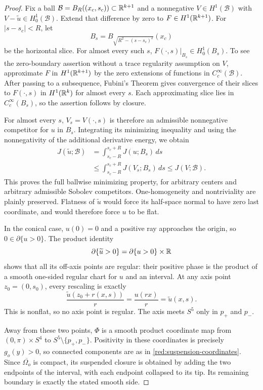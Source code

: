 \begin{proof}
Fix a ball $\mathcal B=B_R((x_c,s_c))\subset\mathbb R^{k+1}$ and a nonnegative
$V\in H^1(\mathcal B)$ with $V-\widetilde u\in H^1_0(\mathcal B)$.
Extend that difference by zero to $F\in H^1(\mathbb R^{k+1})$.  For
$|s-s_c|<R$, let
\[
 B_s=B_{\sqrt{R^2-(s-s_c)^2}}(x_c)
\]
be the horizontal slice.  For almost every such $s$,
$F(\cdot,s)|_{B_s}\in H^1_0(B_s)$.  To see the zero-boundary assertion
without a trace regularity assumption on $V$, approximate $F$ in
$H^1(\mathbb R^{k+1})$ by the zero extensions of functions in
$C_c^\infty(\mathcal B)$.  After passing to a subsequence, Fubini's Theorem
gives convergence of their slices to $F(\cdot,s)$ in $H^1(\mathbb R^k)$ for
almost every $s$.  Each approximating slice lies in $C_c^\infty(B_s)$,
so the assertion follows by closure.

For almost every $s$, $V_s=V(\cdot,s)$ is therefore an admissible
nonnegative competitor for $u$ in $B_s$.  Integrating its minimizing
inequality and using the nonnegativity of the additional derivative energy,
we obtain
\begin{align*}
 J(\widetilde u;\mathcal B)
 &=\int_{s_c-R}^{s_c+R}J(u;B_s)\,ds\\
 &\leq\int_{s_c-R}^{s_c+R}J(V_s;B_s)\,ds
 \leq J(V;\mathcal B).
\end{align*}
This proves the full ballwise minimizing property, for arbitrary centers
and arbitrary admissible Sobolev competitors.  One-homogeneity and
nontriviality are plainly preserved.  Flatness of $\widetilde u$ would
force its half-space normal to have zero last coordinate, and would
therefore force $u$ to be flat.

In the conical case, $u(0)=0$ and a positive ray approaches the origin,
so $0\in\partial\{u>0\}$.  The product identity
\[
 \partial\{\widetilde u>0\}=\partial\{u>0\}\times\mathbb R
\]
shows that all its off-axis points are regular: their positive phase is
the product of a smooth one-sided regular chart for $u$ and an interval.
At any axis point $z_0=(0,s_0)$, every rescaling is exactly
\[
 \frac{\widetilde u(z_0+r(x,s))}{r}
 =\frac{u(rx)}r=\widetilde u(x,s).
\]
This is nonflat, so no axis point is regular.  The axis meets $S^5$
only in $p_+$ and $p_-$.

Away from these two points, $\Phi$ is a smooth product coordinate map
from $(0,\pi)\times S^4$ to $S^5\setminus\{p_+,p_-\}$.
Positivity in these coordinates is precisely $g_o(y)>0$, so connected
components are as in \eqref{red:suspension-coordinates}.  Since
$\overline{\Omega_o}$ is compact, its suspended closure is obtained by
adding the two endpoints of the interval, with each endpoint collapsed
to its tip.  Its remaining boundary is exactly the stated smooth side.
\end{proof}

